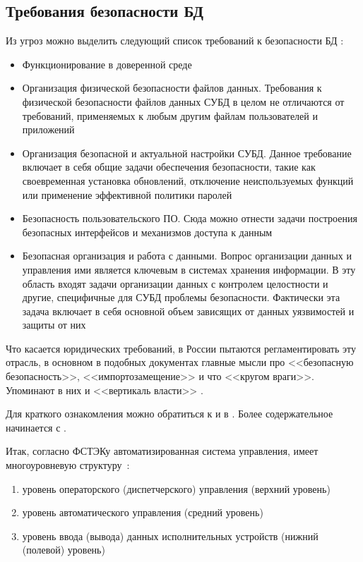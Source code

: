 \subsection{Требования безопасности БД}
Из угроз можно выделить следующий список требований к безопасности БД \autocite{LAPA}:
\begin{itemize}
	\item Функционирование в доверенной среде

	\item Организация физической безопасности файлов данных. Требования к физической безопасности файлов данных СУБД в целом не отличаются от требований, применяемых к любым другим файлам пользователей и приложений

	\item Организация безопасной и актуальной настройки СУБД. Данное требование включает в себя общие задачи обеспечения безопасности, такие как своевременная установка обновлений, отключение неиспользуемых функций или применение эффективной политики паролей

	\item Безопасность пользовательского ПО. Сюда можно отнести задачи построения безопасных интерфейсов и механизмов доступа к данным

	\item Безопасная организация и работа с данными. Вопрос организации данных и управления ими является ключевым в системах хранения информации. В эту область входят задачи организации данных с контролем целостности и другие, специфичные для СУБД проблемы безопасности. Фактически эта задача включает в себя основной объем зависящих от данных уязвимостей и защиты от них
\end{itemize}

Что касается юридических требований, в России пытаются регламентировать эту отрасль, в основном в подобных документах главные мысли про <<безопасную безопасность>>, <<импортозамещение>> и что <<кругом враги>>. Упоминают в них и <<вертикаль власти>> \autocite{Mysev2019, Elin}.

Для краткого ознакомления можно обратиться к \autocite{CONS149FZ} и в \autocite{CONSUP351}. Более содержательное начинается с \autocite{FSTEKOBKIS}.

Итак, согласно ФСТЭКу автоматизированная система управления, имеет многоуровневую структуру~\label{pon:bez}:
\begin{enumerate}
	\item уровень операторского (диспетчерского) управления (верхний уровень)
	\item уровень автоматического управления (средний уровень)
	\item уровень ввода (вывода) данных исполнительных устройств (нижний (полевой) уровень)
\end{enumerate}

